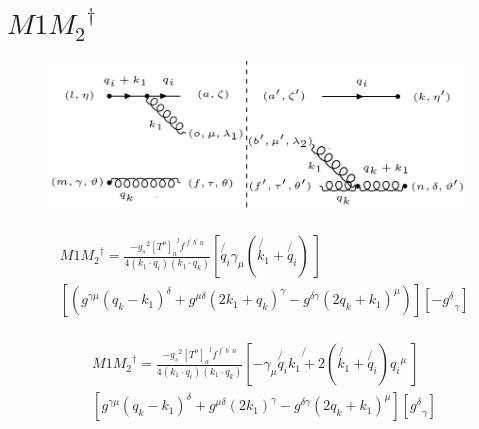 \pagebreak

\section{$ M1{M_2}^{\dagger} $}

\begin{figure}[ht!]
\centering
\includegraphics[scale=0.7]{images/GQ/M1M2DaggerGluon.png}
\end{figure}

\begin{equation}
\begin{split}
&M1{M_2}^{\dagger}=\frac{-{g_s}^2 {[T^{o}]_a}^{l} f^{\:f^{\prime}\: b^{\prime}\:n}}{4(k_1 \cdot q_i)(k_1 \cdot q_k)}[\not{q_i}{\gamma}_{\mu}(\not{k_1}+\not{q_i})\:]\\
&[ (g^{{{\gamma}}{{\mu}}}(q_k-k_1)^{\delta}+g^{{{\mu}}{{\delta}}}(2k_1 +q_k)^{{\gamma}}-g^{\delta{{\gamma}}}(2q_k+k_1)^{{\mu}})][-{g^{\delta}}_{\gamma}]\\
\end{split}
\end{equation}

\begin{equation}
\begin{split}
&M1{M_2}^{\dagger}=\frac{-{g_s}^2 {[T^{o}]_a}^{l} f^{\:f^{\prime}\: b^{\prime}\:n}}{4(k_1 \cdot q_i)(k_1 \cdot q_k)}[-\gamma_{\mu}\not{q_i}\not{k_1+2}(\not{k_1}+\not{q_i}){q_i}^{\mu}\:]\\
&[ g^{{{\gamma}}{{\mu}}}(q_k-k_1)^{\delta}+g^{{{\mu}}{{\delta}}}(2k_1 )^{{\gamma}}-g^{\delta{{\gamma}}}(2q_k+k_1)^{{\mu}}][{g^{\delta}}_{\gamma}]\\
\end{split}
\end{equation}

